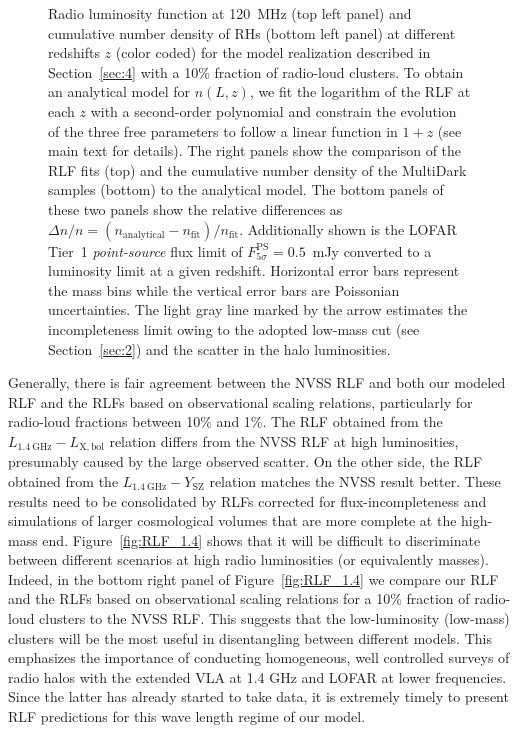 \documentclass[traditabstract]{aa}
\newcommand{\rmn}{\mathrm}
\begin{document}
\begin{figure}[t]
\caption{Radio luminosity function at 120~MHz (top left panel) and cumulative
  number density of RHs (bottom left panel) at different redshifts $z$ (color
  coded) for the model realization described in Section~\ref{sec:4} with a 10\%
  fraction of radio-loud clusters. To obtain an analytical model for $n(L,z)$,
  we fit the logarithm of the RLF at each $z$ with a second-order polynomial and
  constrain the evolution of the three free parameters to follow a linear
  function in $1+z$ (see main text for details). The right panels show the
  comparison of the RLF fits (top) and the cumulative number density of the
  MultiDark samples (bottom) to the analytical model. The bottom panels of these
  two panels show the relative differences as $\Delta n / n =
  (n_{\rmn{analytical}} - n_{\rmn{fit}})/n_{\rmn{fit}}$. Additionally shown is
  the LOFAR Tier~1 \emph{point-source} flux limit of
  $F_{5\sigma}^{\rmn{PS}}=0.5$~mJy \citep{2012JApA..tmp...34R} converted to a
  luminosity limit at a given redshift. Horizontal error bars represent the mass
  bins while the vertical error bars are Poissonian uncertainties.  The light
  gray line marked by the arrow estimates the incompleteness limit owing to the
  adopted low-mass cut (see Section~\ref{sec:2}) and the scatter in the halo
  luminosities.}
\label{fig:RLF_120}
\end{figure} 
 
Generally, there is fair agreement between the NVSS RLF and both our modeled RLF
and the RLFs based on observational scaling relations, particularly for
radio-loud fractions between 10\% and 1\%. The RLF obtained from the
$L_{1.4~\rmn{GHz}}-L_{\rmn{X,bol}}$ relation differs from the NVSS RLF at high
luminosities, presumably caused by the large observed scatter. On the other
side, the RLF obtained from the $L_{1.4~\rmn{GHz}}-Y_{\rmn{SZ}}$ relation
matches the NVSS result better. These results need to be consolidated by RLFs
corrected for flux-incompleteness and simulations of larger cosmological volumes
that are more complete at the high-mass end. Figure~\ref{fig:RLF_1.4} shows that
it will be difficult to discriminate between different scenarios at high radio
luminosities (or equivalently masses). Indeed, in the bottom right panel of
Figure~\ref{fig:RLF_1.4} we compare our RLF and the RLFs based on observational
scaling relations for a 10\% fraction of radio-loud clusters to the NVSS
RLF. This suggests that the low-luminosity (low-mass) clusters will be the most
useful in disentangling between different models. This emphasizes the importance
of conducting homogeneous, well controlled surveys of radio halos with the
extended VLA at 1.4 GHz and LOFAR at lower frequencies. Since the latter has
already started to take data, it is extremely timely to present RLF predictions
for this wave length regime of our model.
\end{document}
